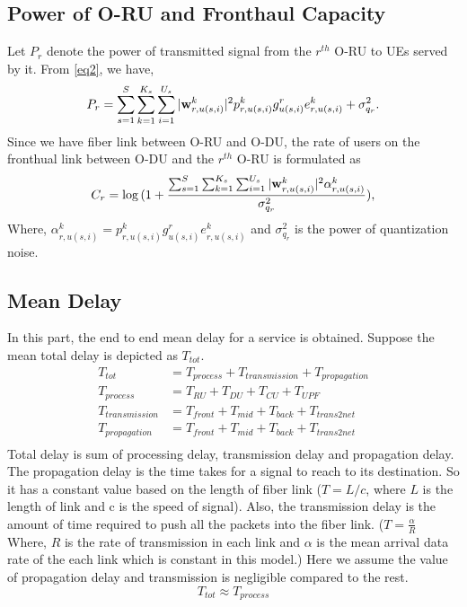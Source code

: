 \documentclass[conference]{IEEEtran}
\begin{document}
\subsection{Power of O-RU and Fronthaul Capacity}
Let $P_r$ denote the power of transmitted signal from the $r^{th}$ O-RU to UEs served by it.
From \eqref{eq2}, we have,
\begin{equation}\label{pr}
P_r = \sum_{s=1}^{S}\sum_{k=1}^{K_s}\sum_{i=1}^{U_s}|\bold{w}_{r,u(s,i)}^{k}|^2 p_{r,u(s,i)}^{k} g_{u(s,i)}^r e^k_{r,u(s,i)}+ \sigma_{q_r}^2.
\end{equation}
Since we have fiber link between O-RU and O-DU, the rate of users on the fronthual link between O-DU and the $r^{th}$ O-RU  is formulated as
\begin{equation}\label{cr}
C_{r} = \log{(1+ \frac{\sum_{s=1}^{S}\sum_{k=1}^{K_s}\sum_{i=1}^{U_s}|\bold{w}_{r,u(s,i)}^{k}|^2 \mathcal{\alpha}^k_{r,u(s,i)} }{ \sigma_{q_{r}}^2})},
\end{equation}
Where, $\mathcal{\alpha}^k_{r,u(s,i)}= p_{r,u(s,i)}^{k} g_{u(s,i)}^r e^k_{r,u(s,i)}$ and $\sigma_{q_{r}}^2$ is the power of quantization noise.
\subsection{Mean Delay}
In this part, the end to end mean delay for a service is obtained.
Suppose the mean total delay is depicted as $T_{tot}$.
\begin{equation}
\begin{split}
T_{tot} &=  T_{process} + T_{transmission} + T_{propagation}\\
T_{process} &=  T_{RU} + T_{DU} + T_{CU} + T_{UPF}\\
T_{transmission} &= T_{front} + T_{mid} + T_{back} + T_{trans2net} \\
T_{propagation} &= T_{front} + T_{mid} + T_{back} + T_{trans2net} \\
\end{split}
\end{equation}
Total delay is sum of processing delay, transmission delay and propagation delay. 
The propagation delay is the time takes for a signal to reach to its destination. So it has a constant value based on the length of fiber link ($T = L/c$, where $L$ is the length of link and c is the speed of signal).
Also, the transmission delay is the amount of time required to push all the packets into the fiber link. 
($T = \frac{\alpha}{R}$ Where, $R$ is the rate of transmission in each link and $\alpha$ is the mean arrival data rate of the each link which is constant in this model.)
Here we assume the value of propagation delay and transmission is negligible compared to the rest.
\begin{equation}
T_{tot} \approx T_{process}
\end{equation}
\end{document}
